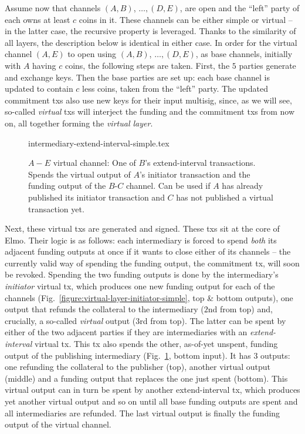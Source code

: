   Assume now that channels $(A, B)$, $\dots,(D, E)$, are open and the ``left''
  party of each owns at least $c$ coins in it. These channels can be either
  simple or virtual -- in the latter case, the recursive property is leveraged.
  Thanks to the similarity of all layers, the description below is identical in
  either case. In order for the virtual channel $(A, E)$ to open using $(A, B)$,
  $\dots,(D, E)$, as base channels, initially with $A$ having $c$ coins, the
  following
  steps are taken. First, the $5$ parties generate and exchange keys. Then the
  base parties are set up: each base channel is updated to contain $c$ less
  coins, taken from the ``left'' party. The updated commitment txs also use new
  keys for their input multisig, since, as we will see, so-called \emph{virtual}
  txs will interject the funding and the commitment txs from now on, all
  together forming the \emph{virtual layer}.

  \addtolength{\intextsep}{-15pt}
  \begin{figure}[!htbp]
    {intermediary-extend-interval-simple.tex}
    \caption{$A-E$ virtual channel: One of $B$'s extend-interval
    transactions. Spends the virtual output of $A$'s
    initiator transaction and the funding output of the $B$-$C$ channel. Can be
    used if $A$ has already published its initiator transaction and $C$ has not
    published a virtual transaction yet.}
    \label{figure:virtual-layer-extend-interval-simple}
  \end{figure}
  \addtolength{\intextsep}{15pt}

  Next, these virtual txs are generated and signed. These txs sit at the core of
  Elmo. Their logic is as follows: each intermediary is forced to spend
  \emph{both} its
  adjacent funding outputs at once if it wants to close either of its channels
  -- the currently valid way of spending the funding output, the commitment tx,
  will soon be revoked. Spending the two funding outputs is done by the
  intermediary's \emph{initiator} virtual tx, which produces one new funding
  output for each of the channels
  (Fig.~\ref{figure:virtual-layer-initiator-simple}, top \& bottom outputs), one
  output that refunds the collateral to the intermediary ($2$nd from top) and,
  crucially, a so-called \emph{virtual} output ($3$rd from top). The latter
  can be spent by either of the two adjacent parties if they are
  intermediaries with an \emph{extend-interval} virtual tx. This tx also
  spends the other, as-of-yet unspent, funding output of the publishing
  intermediary (Fig.~\ref{figure:virtual-layer-extend-interval-simple}, bottom
  input). It has $3$ outputs: one refunding the collateral to the publisher
  (top), another virtual output (middle) and a funding output that replaces the
  one just spent (bottom). This virtual output can in turn be spent by another
  extend-interval tx, which produces yet another virtual output and so on until
  all base funding outputs are spent and all intermediaries are refunded. The
  last virtual output is finally the funding output of the virtual channel.

